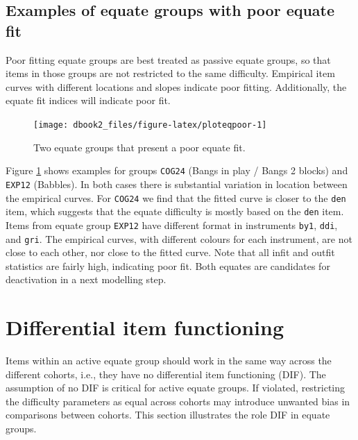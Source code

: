 \documentclass[
]{book}
\begin{document}
\hypertarget{examples-of-equate-groups-with-poor-equate-fit}{%
\subsection{Examples of equate groups with poor equate fit}\label{examples-of-equate-groups-with-poor-equate-fit}}

Poor fitting equate groups are best treated as passive equate groups, so that items in those groups are not restricted to the same difficulty. Empirical item curves with different locations and slopes indicate poor fitting. Additionally, the equate fit indices will indicate poor fit.

\begin{figure}

{\centering \texttt{[image: dbook2\_files/figure-latex/ploteqpoor-1]} 

}

\caption{Two equate groups that present a poor equate fit.}\label{fig:ploteqpoor}
\end{figure}



Figure \ref{fig:ploteqpoor} shows examples for groups \texttt{COG24} (Bangs in play / Bangs 2 blocks) and \texttt{EXP12} (Babbles). In both cases there is substantial variation in location between the empirical curves. For \texttt{COG24} we find that the fitted curve is closer to the \texttt{den} item, which suggests that the equate difficulty is mostly based on the \texttt{den} item. Items from equate group \texttt{EXP12} have different format in instruments \texttt{by1}, \texttt{ddi}, and \texttt{gri}. The empirical curves, with different colours for each instrument, are not close to each other, nor close to the fitted curve. Note that all infit and outfit statistics are fairly high, indicating poor fit. Both equates are candidates for deactivation in a next modelling step.

\hypertarget{sec:equatedif}{%
\section{Differential item functioning}\label{sec:equatedif}}

Items within an active equate group should work in the same way across the different cohorts, i.e., they have no differential item functioning (DIF). The assumption of no DIF is critical for active equate groups. If violated, restricting the difficulty parameters as equal across cohorts may introduce unwanted bias in comparisons between cohorts. This section illustrates the role DIF in equate groups.
\end{document}
